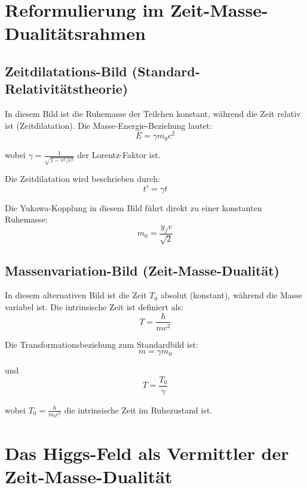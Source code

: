 \documentclass[a4paper,12pt]{article}
\begin{document}
	\section{Reformulierung im Zeit-Masse-Dualitätsrahmen}
	
	\subsection{Zeitdilatations-Bild (Standard-Relativitätstheorie)}
	
	In diesem Bild ist die Ruhemasse der Teilchen konstant, während die Zeit relativ ist (Zeitdilatation). Die Masse-Energie-Beziehung lautet:
	\begin{equation}
		E = \gamma m_0 c^2
	\end{equation}
	
	wobei $\gamma = \frac{1}{\sqrt{1-v^2/c^2}}$ der Lorentz-Faktor ist.
	
	Die Zeitdilatation wird beschrieben durch:
	\begin{equation}
		t' = \gamma t
	\end{equation}
	
	Die Yukawa-Kopplung in diesem Bild führt direkt zu einer konstanten Ruhemasse:
	\begin{equation}
		m_0 = \frac{y_f v}{\sqrt{2}}
	\end{equation}
	
	\subsection{Massenvariation-Bild (Zeit-Masse-Dualität)}
	
	In diesem alternativen Bild ist die Zeit $T_0$ absolut (konstant), während die Masse variabel ist. Die intrinsische Zeit ist definiert als:
	\begin{equation}
		T = \frac{\hbar}{m c^2}
	\end{equation}
	
	Die Transformationsbeziehung zum Standardbild ist:
	\begin{equation}
		m = \gamma m_0
	\end{equation}
	
	und
	\begin{equation}
		T = \frac{T_0}{\gamma}
	\end{equation}
	
	wobei $T_0 = \frac{\hbar}{m_0 c^2}$ die intrinsische Zeit im Ruhezustand ist.
	
	\section{Das Higgs-Feld als Vermittler der Zeit-Masse-Dualität}
	
\end{document}
